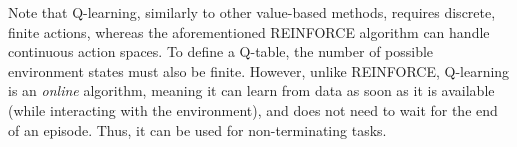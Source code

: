 Note that Q-learning, similarly to other value-based methods, requires discrete, finite actions, whereas the aforementioned REINFORCE algorithm can handle continuous action spaces. To define a Q-table, the number of possible environment states must also be finite. However, unlike REINFORCE, Q-learning is an \textit{online} algorithm, meaning it can learn from data as soon as it is available (while interacting with the environment), and does not need to wait for the end of an episode. Thus, it can be used for non-terminating tasks. \cite{bible}